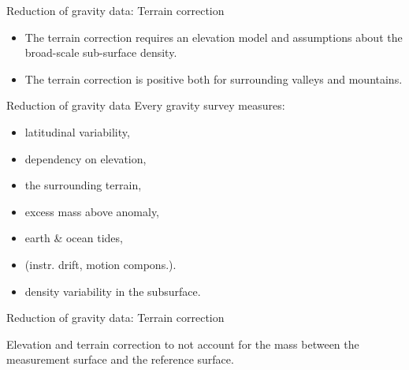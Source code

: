 \begin{frame}
  \begin{PointSix}{Reduction of gravity data: Terrain correction}
  \begin{itemize}
    \item The terrain correction requires an elevation model and assumptions about the broad-scale sub-surface density.
    \item The terrain correction is positive both for surrounding valleys and mountains.
  \end{itemize}
\end{PointSix}
\end{frame}

\begin{frame}
  \begin{PointSix}{Reduction of gravity data}
    Every gravity survey measures:
    \begin{itemize}
      \item \textcolor{MyBlue}{latitudinal variability},
      \item \textcolor{MyBlue}{dependency on elevation},
      \item \textcolor{MyBlue}{the surrounding terrain},
      \item excess mass above anomaly,
      \item earth \& ocean tides,
      \item (instr. drift, motion compons.).
      \item \alert{density variability in the subsurface.}
    \end{itemize}
  \end{PointSix}
\end{frame}

\begin{frame}
  \begin{PointSix}{Reduction of gravity data: Terrain correction}
  \small Elevation and terrain correction to not account for the mass between the measurement surface and the reference surface.
  \end{PointSix}
\end{frame}

